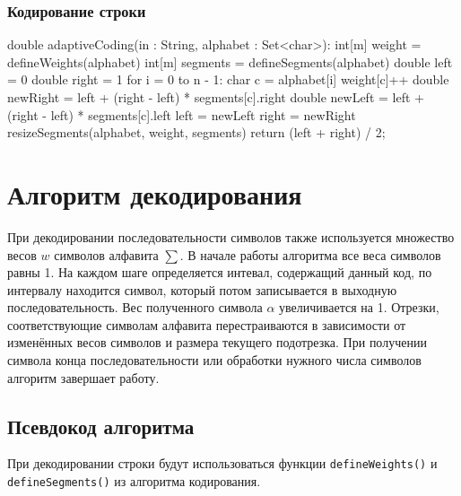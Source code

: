 \documentclass[12pt]{article}
\begin{document}
\subsubsection*{Кодирование строки}
\begin{listing}{1}
double adaptiveCoding(in : String, alphabet : Set<char>):
    int[m] weight = defineWeights(alphabet)
    int[m] segments = defineSegments(alphabet)
    double left = 0
    double right = 1
    for i = 0 to n - 1:
        char c = alphabet[i]
        weight[c]++
        double newRight = left + (right - left) * segments[c].right
        double newLeft = left + (right - left) * segments[c].left
        left = newLeft
        right = newRight
        resizeSegments(alphabet, weight, segments)
    return (left + right) / 2;
\end{listing}

\section*{Алгоритм декодирования}
При декодировании последовательности символов также используется множество весов $w$ символов алфавита $\sum$. В начале работы алгоритма все веса символов равны 1.  На каждом шаге определяется интевал, содержащий данный код, по интервалу находится символ, который потом записывается в выходную последовательность. Вес полученного символа $\alpha$ увеличивается на 1. Отрезки, соответствующие символам алфавита перестраиваются в зависимости от изменённых весов символов и размера текущего подотрезка. При получении символа конца последовательности или обработки нужного числа символов алгоритм завершает работу.

\subsection*{Псевдокод алгоритма}
При декодировании строки будут использоваться функции \verb'defineWeights()' и \verb'defineSegments()' из алгоритма кодирования.
\end{document}
